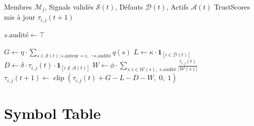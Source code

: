\documentclass[12pt,a4paper]{article}
\theoremstyle{definition}
\theoremstyle{plain}
\theoremstyle{remark}
\newcommand{\trustscore}{\tau}
\newcommand{\1}{\mathbf{1}}
\newcommand{\clip}{\operatorname{clip}}
\begin{document}
\begin{algorithm}[H]
\caption{Mise à jour du TrustScore --- CTP v0.1}
\begin{algorithmic}[1]
\Require Membres $\mathcal{M}_j$, Signals validés $\mathcal{S}(t)$, Défauts $\mathcal{D}(t)$, Actifs $\mathcal{A}(t)$
\Ensure TrustScores mis à jour $\trustscore_{i,j}(t+1)$

    \State $s.\text{audité} \leftarrow \top$
  \EndIf
\EndFor

  \State $G \leftarrow \eta \cdot \sum_{s \in \mathcal{S}(t) : s.\text{auteur}=i,\; \neg s.\text{audité}} q(s)$
  \State $L \leftarrow \kappa \cdot \1_{[i \in \mathcal{D}(t)]}$
  \State $D \leftarrow \delta \cdot \trustscore_{i,j}(t) \cdot \1_{[i \notin \mathcal{A}(t)]}$
  \State $W \leftarrow \phi \cdot \sum_{s : i \in \mathcal{W}(s),\; s.\text{audité}} \frac{\trustscore_{i,j}(t)}{|\mathcal{W}(s)|}$
  \State $\trustscore_{i,j}(t+1) \leftarrow \clip(\trustscore_{i,j}(t) + G - L - D - W,\; 0,\; 1)$
\EndFor
\end{algorithmic}
\end{algorithm}

\section{Symbol Table}
\end{document}
